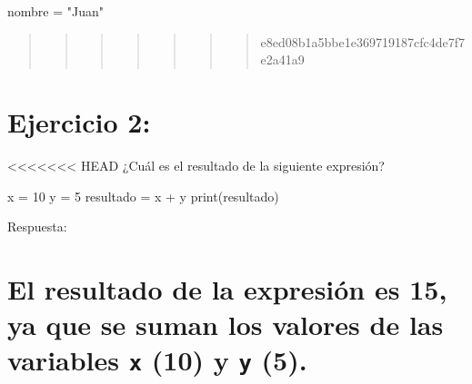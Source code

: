 \documentclass[
  a4paper,
  DIV=11,
  numbers=noendperiod,
  onepage,
  openany]{scrreprt}
\newenvironment{Shaded}{\begin{snugshade}}{\end{snugshade}}
\newcommand{\BuiltInTok}[1]{\textcolor[rgb]{0.00,0.23,0.31}{#1}}
\newcommand{\DecValTok}[1]{\textcolor[rgb]{0.68,0.00,0.00}{#1}}
\newcommand{\NormalTok}[1]{\textcolor[rgb]{0.00,0.23,0.31}{#1}}
\newcommand{\OperatorTok}[1]{\textcolor[rgb]{0.37,0.37,0.37}{#1}}
\newcommand{\StringTok}[1]{\textcolor[rgb]{0.13,0.47,0.30}{#1}}
\begin{document}
\begin{Shaded}
\begin{Highlighting}[]
\NormalTok{nombre }\OperatorTok{=} \StringTok{"Juan"}
\end{Highlighting}
\end{Shaded}

\begin{quote}
\begin{quote}
\begin{quote}
\begin{quote}
\begin{quote}
\begin{quote}
\begin{quote}
e8ed08b1a5bbe1e369719187cfc4de7f7e2a41a9
\end{quote}
\end{quote}
\end{quote}
\end{quote}
\end{quote}
\end{quote}
\end{quote}

\hypertarget{ejercicio-2}{%
\chapter{Ejercicio 2:}\label{ejercicio-2}}

\textless\textless\textless\textless\textless\textless\textless{} HEAD
¿Cuál es el resultado de la siguiente expresión?

\begin{Shaded}
\begin{Highlighting}[]
\NormalTok{x }\OperatorTok{=} \DecValTok{10}
\NormalTok{y }\OperatorTok{=} \DecValTok{5}
\NormalTok{resultado }\OperatorTok{=}\NormalTok{ x }\OperatorTok{+}\NormalTok{ y}
\BuiltInTok{print}\NormalTok{(resultado)}
\end{Highlighting}
\end{Shaded}

Respuesta:

\hypertarget{el-resultado-de-la-expresiuxf3n-es-15-ya-que-se-suman-los-valores-de-las-variables-x-10-y-y-5.}{%
\chapter{\texorpdfstring{El resultado de la expresión es 15, ya que se
suman los valores de las variables \texttt{x} (10) y \texttt{y}
(5).}{El resultado de la expresión es 15, ya que se suman los valores de las variables x (10) y y (5).}}\label{el-resultado-de-la-expresiuxf3n-es-15-ya-que-se-suman-los-valores-de-las-variables-x-10-y-y-5.}}
\end{document}

